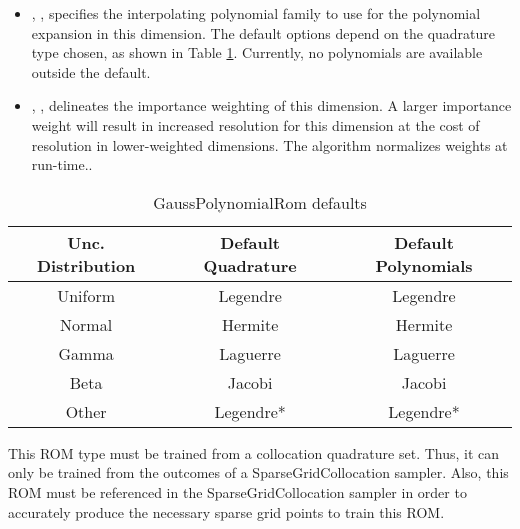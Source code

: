 \begin{itemize}
\begin{itemize}
      \nb For an uncertain distribution aside from the four listed on Table
      \ref{tab:gpcCompatible}, this ROM
      makes use of the uniform-like range of the distribution's CDF to apply quadrature that is
      suited uniform uncertainty (Legendre).  It converges more slowly than the four listed, but are
      viable choices.  Choosing polynomial type Legendre for any non-uniform distribution will
      enable this formulation automatically.
    \item {}, ,
      specifies the interpolating polynomial family to use for the polynomial expansion in this
      dimension.  The default options depend on the quadrature type chosen, as shown in Table
      \ref{tab:gpcCompatible}.  Currently, no polynomials are available outside the
      default. 
    \item  {}, ,
      delineates the importance weighting of this dimension.  A larger importance weight will
      result in increased resolution for this dimension at the cost of resolution in lower-weighted
      dimensions.  The algorithm normalizes weights at run-time..
  \end{itemize}
\end{itemize}
\begin{table}[htb]
  \centering
  \begin{tabular}{c | c c}
    Unc. Distribution & Default Quadrature & Default Polynomials \\ \hline
    Uniform & Legendre & Legendre \\
    Normal & Hermite & Hermite \\ \hline
    Gamma & Laguerre & Laguerre \\
    Beta & Jacobi & Jacobi \\ \hline
    Other & Legendre* & Legendre*
  \end{tabular}
  \caption{GaussPolynomialRom defaults}
  \label{tab:gpcCompatible}
\end{table}
%
\nb This ROM type must be trained from a collocation quadrature set.
%
Thus, it can only be trained from the outcomes of a SparseGridCollocation sampler.
Also, this ROM must be referenced in the SparseGridCollocation sampler in order to
accurately produce the necessary sparse grid points to train this ROM.

